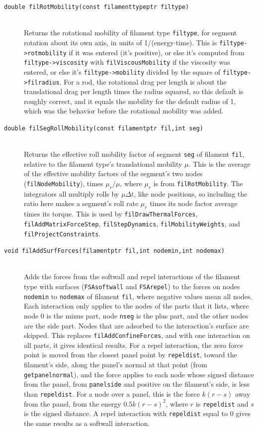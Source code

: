 \documentclass {scrbook}
\newcommand {\ttt} {\texttt}
\begin{document}
\begin{description}
\item[\ttt{double filRotMobility(const filamenttypeptr filtype)}]
\hfill \\
Returns the rotational mobility of filament type \ttt{filtype}, for segment rotation about its own axis, in units of 1/(energy$\cdot$time). This is \ttt{filtype->rotmobility} if it was entered (it's positive), or else it's computed from \ttt{filtype->viscosity} with \ttt{filViscousMobility} if the viscosity was entered, or else it's \ttt{filtype->mobility} divided by the square of \ttt{filtype->filradius}. For a rod, the rotational drag per length is about the translational drag per length times the radius squared, so this default is roughly correct, and it equals the mobility for the default radius of 1, which was the behavior before the rotational mobility was added.

\item[\ttt{double filSegRollMobility(const filamentptr fil,int seg)}]
\hfill \\
Returns the effective roll mobility factor of segment \ttt{seg} of filament \ttt{fil}, relative to the filament type's translational mobility $\mu$. This is the average of the effective mobility factors of the segment's two nodes (\ttt{filNodeMobility}), times $\mu_r/\mu$, where $\mu_r$ is from \ttt{filRotMobility}. The integrators all multiply rolls by $\mu\Delta t$, like node positions, so including the ratio here makes a segment's roll rate $\mu_r$ times its node factor average times its torque. This is used by \ttt{filDrawThermalForces}, \ttt{filAddMatrixForceStep}, \ttt{filStepDynamics}, \ttt{filMobilityWeights}, and \ttt{filProjectConstraints}.

\item[\ttt{void filAddSurfForces(filamentptr fil,int nodemin,int nodemax)}] %
\hfill \\
Adds the forces from the softwall and repel interactions of the filament type with surfaces (\ttt{FSAsoftwall} and \ttt{FSArepel}) to the forces on nodes \ttt{nodemin} to \ttt{nodemax} of filament \ttt{fil}, where negative values mean all nodes. Each interaction only applies to the nodes of the parts that it lists, where node 0 is the minus part, node \ttt{nseg} is the plus part, and the other nodes are the side part. Nodes that are adsorbed to the interaction's surface are skipped. This replaces \ttt{filAddConfineForces}, and with one interaction on all parts, it gives identical results. For a repel interaction, the zero force point is moved from the closest panel point by \ttt{repeldist}, toward the filament's side, along the panel's normal at that point (from \ttt{getpanelnormal}), and the force applies to each node whose signed distance from the panel, from \ttt{panelside} and positive on the filament's side, is less than \ttt{repeldist}. For a node over a panel, this is the force $k(r-s)$ away from the panel, from the energy $0.5k(r-s)^2$, where $r$ is \ttt{repeldist} and $s$ is the signed distance. A repel interaction with \ttt{repeldist} equal to 0 gives the same results as a softwall interaction.


\end{description}
\end{document}

